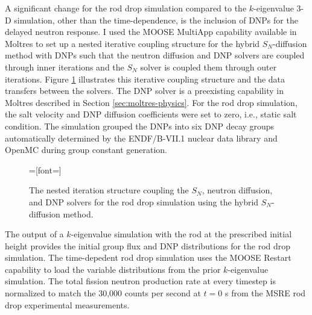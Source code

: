 A significant change for the rod drop simulation compared to the $k$-eigenvalue 3-D simulation,
other than the time-dependence, is the inclusion of \glspl{DNP} for the delayed neutron response.
I used the \gls{MOOSE} MultiApp capability available in Moltres to set up a nested iterative
coupling structure for the hybrid
$S_N$-diffusion method with \glspl{DNP} such that the neutron diffusion and \gls{DNP} solvers are
coupled through inner iterations and the $S_N$ solver is coupled them through outer iterations.
Figure \ref{fig:rod-drop-coupling} illustrates this iterative coupling structure and the data
transfers between the solvers. The \gls{DNP} solver is a preexisting capability in Moltres
described in Section \ref{sec:moltres-physics}. For the rod drop simulation, the salt velocity and
\gls{DNP} diffusion coefficients were set to zero, i.e., static salt condition. The simulation
grouped the \glspl{DNP} into six \gls{DNP} decay groups automatically determined by the
ENDF/B-VII.1 nuclear data library \cite{chadwick_endf/b-vii.1_2011} and OpenMC during group
constant generation.

\begin{figure}[t]
  =[font=\small]
  \centering
  \caption{The nested iteration structure coupling the $S_N$, neutron diffusion, and \gls{DNP}
  solvers for the rod drop simulation using the hybrid $S_N$-diffusion method.}
  \label{fig:rod-drop-coupling}
\end{figure}

The output of a $k$-eigenvalue simulation with the rod at the prescribed initial height provides
the initial group flux and \gls{DNP} distributions for the rod drop simulation. The time-depedent
rod drop simulation uses the \gls{MOOSE} Restart capability to load the variable distributions from
the prior $k$-eigenvalue simulation. The total fission neutron production rate at every timestep
is normalized to match the 30,000 counts per second at $t=0$ s from the \gls{MSRE} rod drop
experimental measurements.

